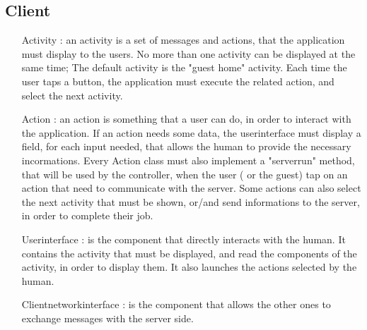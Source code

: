 	\subsection{Client}
	 \begin{itemize}
	  \item [Activity]: an activity is a set of messages and actions, that the application must display to the users.
	  No more than one activity can be displayed at the same time;
	  The default activity is the "guest home" activity. Each time the user taps a button, the application must execute
	  the related action, and select the next activity.
	  \item [Action]: an action is something that a user can do, in order to interact with the application.
	  If an action needs some data, the userinterface must display a field, for each input needed, that allows the human
	  to provide the necessary incormations. Every Action class must also implement a "serverrun" method, that will be used by the 			      controller, when the user ( or the guest) tap on an action that need to communicate with the server.
	  Some actions can also select the next activity that must be shown, or/and send informations to the server,
	  in order to complete their job.
	  \item [Userinterface]: is the component that directly interacts with the human.
	  It contains the activity that must be displayed, and read the components of the activity, in order to display them.
	  It also launches the actions selected by the human.
	  \item[Clientnetworkinterface]: is the component that allows the other ones to exchange messages with the server side.
	 \end{itemize}
